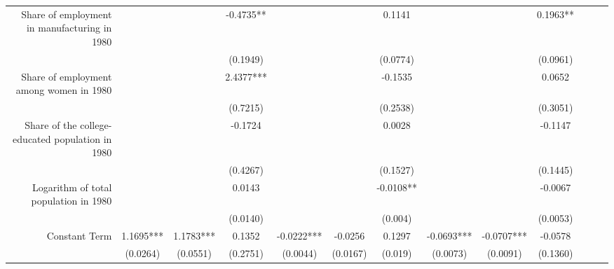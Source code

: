 \begin{frame}
\begin{table}[ht]
{\begin{tabular}{rcccccccccccc}
Share of employment in manufacturing in 1980                 

                &                &                & -0.4735**      &                &                & 0.1141         &                 &                & 0.1963**       \\
                &                &                & \small(0.1949) &                &                & \small(0.0774) &                 &                & \small(0.0961) \\

Share of employment among women in 1980                      

                &                &                & 2.4377***      &                &                & -0.1535        &                 &                & 0.0652         \\
                &                &                & \small(0.7215) &                &                & \small(0.2538) &                 &                & \small(0.3051) \\

Share of the college-educated population in 1980             

                &                &                & -0.1724        &                &                & 0.0028         &                 &                & -0.1147        \\
                &                &                & \small(0.4267) &                &                & \small(0.1527) &                 &                & \small(0.1445) \\

Logarithm of total population in 1980                        

                &                &                & 0.0143         &                &                & -0.0108**     &                  &                & -0.0067        \\
                &                &                & \small(0.0140) &                &                & \small(0.004) &                  &                & \small(0.0053) \\

Constant Term

                & 1.1695***      & 1.1783***      & 0.1352         & -0.0222***     & -0.0256        & 0.1297        & -0.0693***       & -0.0707***     & -0.0578        \\
                & \small(0.0264) & \small(0.0551) & \small(0.2751) & \small(0.0044) & \small(0.0167) & \small(0.019) & \small(0.0073)   & \small(0.0091) & \small(0.1360) \\


\end{tabular}}
\end{table}
\end{frame}
